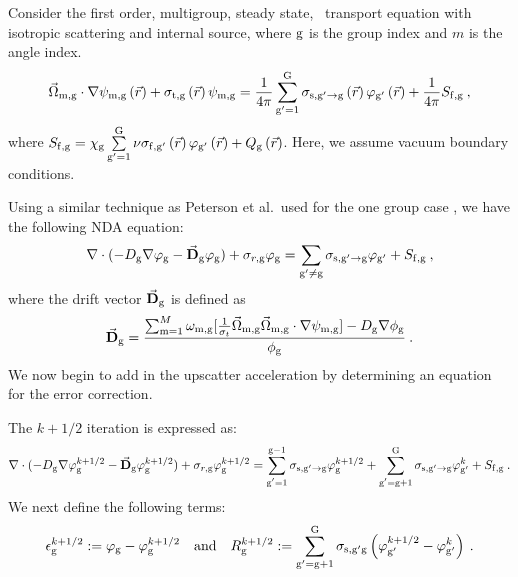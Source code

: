 Consider the first order, multigroup, steady state, \sn\ transport equation with isotropic scattering and internal source, where $\mathrm{g}$ is the group index and $m$ is the angle index.
  \begin{equation}
  \vec{\Omega}_{\mathrm{m},\mathrm{g}}\cdot \nabla \psi_{\mathrm{m},\mathrm{g}} \left(\vec{r}\right)+ \sigma_{\mathrm{t},\mathrm{g}}\left(\vec{r}\right)\psi_{\mathrm{m},\mathrm{g}} = \frac{1}{4 \pi} \sum\limits_{\mathrm{g}'=1}^{\mathrm{G}} \sigma_{\mathrm{s},{\mathrm{g}'}\to\mathrm{g}}\left(\vec{r}\right) \varphi_{\mathrm{g}'}\left(\vec{r}\right) + \frac{1}{4 \pi} S_\mathrm{f,g}\:,
  \end{equation}
  where  $S_\mathrm{f,g} = \chi_{\mathrm{g}} \sum\limits_{\mathrm{g}'=1}^{\mathrm{G}} \nu \sigma_{\mathrm{f},\mathrm{g}'}\left(\vec{r}\right) \varphi_{\mathrm{g}'}\left(\vec{r}\right) + Q_{\mathrm{g}} \left(\vec{r}\right)$. Here, we assume vacuum boundary conditions.
  \par
  Using a similar technique as Peterson et al.\ used for the one group case \cite{morel-holo}, we have the following NDA equation:
  \begin{equation}
  \nabla\cdot(-D_{\mathrm{g}} \nabla \varphi_{\mathrm{g}} - \vec{\bf D}_{\mathrm{g}} \varphi_{\mathrm{g}}) + \sigma_{r,\mathrm{g}} \varphi_{\mathrm{g}} = \sum\limits_{{\mathrm{g}'}\neq\mathrm{g}}\sigma_{\mathrm{s},\mathrm{g}' \rightarrow \mathrm{g}}\varphi_{\mathrm{g}'} + S_\mathrm{f,g} \:, \label{eq:NDA}
  \end{equation}
  where the drift vector $\vec{\bf D}_{\mathrm{g}}$ is defined as
  \begin{equation}
  \vec{\bf D}_{\mathrm{g}}= \frac{\sum_{\mathrm{m}=1}^M \omega_{\mathrm{m}, \mathrm{g}} [\frac{1}{\sigma_t} \vec{\Omega}_{\mathrm{m}, \mathrm{g}} \vec{\Omega}_{\mathrm{m}, \mathrm{g}} \cdot \nabla\psi_{\mathrm{m}, \mathrm{g}}] - D_{\mathrm{g}} \nabla \phi_{\mathrm{g}}}{\phi_{\mathrm{g}}}\:.
  \end{equation}
  We now begin to add in the upscatter acceleration by determining an equation for the error correction.
  \par
  The $k + 1/2$ iteration is expressed as:
  \begin{equation}
  \nabla\cdot(-D_{\mathrm{g}} \nabla \varphi_{\mathrm{g}}^{k+1/2} - \vec{\bf D}_{\mathrm{g}} \varphi_{\mathrm{g}}^{k+1/2}) + \sigma_{r,\mathrm{g}} \varphi_{\mathrm{g}}^{k+1/2} = \sum\limits_{\substack{\mathrm{g}'=1}}^{\mathrm{g-1}} \sigma_{\mathrm{s},\mathrm{g}' \to\mathrm{g}}\varphi_{\mathrm{g}}^{k+1/2} + \sum\limits_{\substack{\mathrm{g}'=\mathrm{g}+1}}^{\mathrm{G}} \sigma_{\mathrm{s},\mathrm{g}' \to\mathrm{g}}\varphi_{\mathrm{g}'}^{k} + S_\mathrm{f,g}\:. \label{eq:k1/2}
  \end{equation}
  We next define the following terms:
  \begin{equation}
  \epsilon_{\mathrm{g}}^{k+1/2} := \varphi_{\mathrm{g}} - \varphi_{\mathrm{g}}^{k + 1/2} \quad \mathrm{and} \quad R_{\mathrm{g}}^{k+1/2} := \sum\limits_{\mathrm{g}'=\mathrm{g}+1}^{\mathrm{G}} \sigma_{\mathrm{s},\mathrm{g}' \mathrm{g}}\left(\varphi_{\mathrm{g}'}^{k + 1/2} - \varphi_{\mathrm{g}'}^k\right)\:.
  \end{equation}
